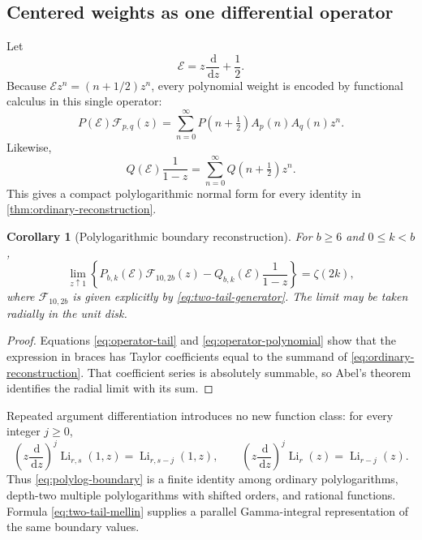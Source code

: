 \documentclass[11pt]{article}
\newtheorem{corollary}[theorem]{Corollary}
\theoremstyle{definition}
\newcommand{\Li}{\operatorname{Li}}
\newcommand{\dd}{\,\mathrm{d}}
\newcommand{\Eop}{\mathcal{E}}
\newcommand{\calF}{\mathcal{F}}
\begin{document}
\subsection{Centered weights as one differential operator}

Let
\begin{equation}
 \Eop=z\frac{\dd}{\dd z}+\frac12.
 \label{eq:centered-Euler}
\end{equation}
Because $\Eop z^n=(n+1/2)z^n$, every polynomial weight is encoded by
functional calculus in this single operator:
\begin{equation}
 P(\Eop)\calF_{p,q}(z)
 =\sum_{n=0}^{\infty}P(n+\tfrac12)A_p(n)A_q(n)z^n.
 \label{eq:operator-tail}
\end{equation}
Likewise,
\begin{equation}
 Q(\Eop)\frac1{1-z}
 =\sum_{n=0}^{\infty}Q(n+\tfrac12)z^n.
 \label{eq:operator-polynomial}
\end{equation}
This gives a compact polylogarithmic normal form for every identity in
\cref{thm:ordinary-reconstruction}.

\begin{corollary}[Polylogarithmic boundary reconstruction]
\label{cor:polylog-boundary}
For $b\ge6$ and $0\le k<b$,
\begin{equation}
 \boxed{\displaystyle
 \lim_{z\uparrow1}
 \left\{
 P_{b,k}(\Eop)\calF_{10,2b}(z)
 -Q_{b,k}(\Eop)\frac1{1-z}
 \right\}=\zeta(2k),}
 \label{eq:polylog-boundary}
\end{equation}
where $\calF_{10,2b}$ is given explicitly by
\eqref{eq:two-tail-generator}.  The limit may be taken radially in the
unit disk.
\end{corollary}

\begin{proof}
Equations \eqref{eq:operator-tail} and
\eqref{eq:operator-polynomial} show that the expression in braces has
Taylor coefficients equal to the summand of
\eqref{eq:ordinary-reconstruction}.  That coefficient series is
absolutely summable, so Abel's theorem identifies the radial limit with
its sum.
\end{proof}

Repeated argument differentiation introduces no new function class:
for every integer $j\ge0$,
\begin{equation}
 \left(z\frac{\dd}{\dd z}\right)^j\Li_{r,s}(1,z)
   =\Li_{r,s-j}(1,z),
 \qquad
 \left(z\frac{\dd}{\dd z}\right)^j\Li_r(z)=\Li_{r-j}(z).
 \label{eq:order-lowering}
\end{equation}
Thus \eqref{eq:polylog-boundary} is a finite identity among ordinary
polylogarithms, depth-two multiple polylogarithms with shifted orders,
and rational functions.  Formula \eqref{eq:two-tail-mellin} supplies a
parallel Gamma-integral representation of the same boundary values.
\end{document}
